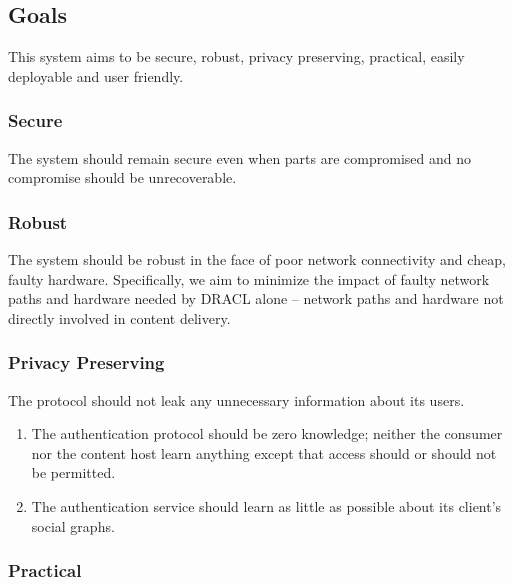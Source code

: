 \documentclass[pdftex,12pt,a4papaer]{article}
\begin{document}
\subsection{Goals}

This system aims to be secure, robust, privacy preserving, practical, easily deployable
and user friendly.

\subsubsection{Secure}

The system should remain secure even when parts are compromised and no
compromise should be unrecoverable.


\subsubsection{Robust}

The system should be robust in the face of poor network connectivity and cheap,
faulty hardware. Specifically, we aim to minimize the impact of faulty network
paths and hardware needed by DRACL alone -- network paths and hardware not
directly involved in content delivery.

\begin{comment}
    * AP out of hot path.
    * AP does very little work.
    * CH avoids network connections.
\end{comment}

\subsubsection{Privacy Preserving}

The protocol should not leak any unnecessary information about its users.

\begin{enumerate}
    \item The authentication protocol should be zero knowledge; neither the
        consumer nor the content host learn anything except that access should
        or should not be permitted.
    \item The authentication service should learn as little as possible about
        its client's social graphs.
\end{enumerate}

\subsubsection{Practical}
\end{document}
